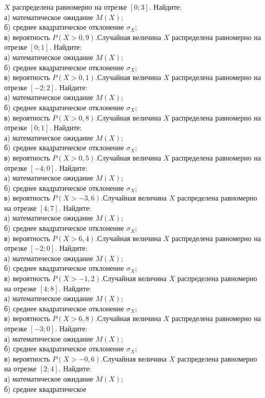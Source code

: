 $X$ распределена равномерно на отрезке $[0; 3]$. Найдите: \\ \quad а) математическое ожидание $M(X)$; \\ \quad б) среднее квадратическое отклонение $\sigma_X$; \\ \quad в) вероятность $P(X>0{,}9)$.Случайная величина $X$ распределена равномерно на отрезке $[0; 1]$. Найдите: \\ \quad а) математическое ожидание $M(X)$; \\ \quad б) среднее квадратическое отклонение $\sigma_X$; \\ \quad в) вероятность $P(X>0{,}1)$.Случайная величина $X$ распределена равномерно на отрезке $[-2; 2]$. Найдите: \\ \quad а) математическое ожидание $M(X)$; \\ \quad б) среднее квадратическое отклонение $\sigma_X$; \\ \quad в) вероятность $P(X>0{,}8)$.Случайная величина $X$ распределена равномерно на отрезке $[0; 1]$. Найдите: \\ \quad а) математическое ожидание $M(X)$; \\ \quad б) среднее квадратическое отклонение $\sigma_X$; \\ \quad в) вероятность $P(X>0{,}5)$.Случайная величина $X$ распределена равномерно на отрезке $[-4; 0]$. Найдите: \\ \quad а) математическое ожидание $M(X)$; \\ \quad б) среднее квадратическое отклонение $\sigma_X$; \\ \quad в) вероятность $P(X>-3{,}6)$.Случайная величина $X$ распределена равномерно на отрезке $[4; 7]$. Найдите: \\ \quad а) математическое ожидание $M(X)$; \\ \quad б) среднее квадратическое отклонение $\sigma_X$; \\ \quad в) вероятность $P(X>6{,}4)$.Случайная величина $X$ распределена равномерно на отрезке $[-2; 0]$. Найдите: \\ \quad а) математическое ожидание $M(X)$; \\ \quad б) среднее квадратическое отклонение $\sigma_X$; \\ \quad в) вероятность $P(X>-1{,}2)$.Случайная величина $X$ распределена равномерно на отрезке $[4; 8]$. Найдите: \\ \quad а) математическое ожидание $M(X)$; \\ \quad б) среднее квадратическое отклонение $\sigma_X$; \\ \quad в) вероятность $P(X>6{,}8)$.Случайная величина $X$ распределена равномерно на отрезке $[-3; 0]$. Найдите: \\ \quad а) математическое ожидание $M(X)$; \\ \quad б) среднее квадратическое отклонение $\sigma_X$; \\ \quad в) вероятность $P(X>-0{,}6)$.Случайная величина $X$ распределена равномерно на отрезке $[2; 4]$. Найдите: \\ \quad а) математическое ожидание $M(X)$; \\ \quad б) среднее квадратическое 